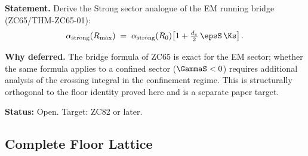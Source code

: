 \documentclass[12pt, a4paper]{article}
\begin{document}
\begin{openqbox}[title={GAP-ZC81-01: Strong Sector
  $R_0{\to}R_{\max}$ Running Bridge}]

\textbf{Statement.}
Derive the Strong sector analogue of the EM running bridge
(ZC65/THM-ZC65-01):
\[
  \alpha_{\rm strong}(R_{\max})
  \;=\; \alpha_{\rm strong}(R_0)
  \!\left[1 + \tfrac{d_s}{2}\,\epsS\,\Ks\right].
\]

\textbf{Why deferred.}
The bridge formula of ZC65 is exact for the EM sector; whether
the same formula applies to a confined sector ($\GammaS < 0$)
requires additional analysis of the crossing integral in the
confinement regime. This is structurally orthogonal to the floor
identity proved here and is a separate paper target.

\textbf{Status:} Open. Target: ZC82 or later.
\end{openqbox}

\subsection{Complete Floor Lattice}
\label{sec:lattice}
\end{document}
